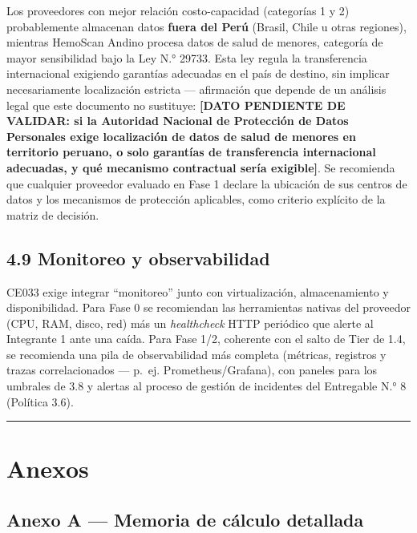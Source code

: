 \documentclass[11pt,a4paper]{article}
\begin{document}
Los proveedores con mejor relación costo-capacidad (categorías 1 y 2) probablemente almacenan datos \textbf{fuera del Perú} (Brasil, Chile u otras regiones), mientras HemoScan Andino procesa datos de salud de menores, categoría de mayor sensibilidad bajo la Ley N.° 29733. Esta ley regula la transferencia internacional exigiendo garantías adecuadas en el país de destino, sin implicar necesariamente localización estricta --- afirmación que depende de un análisis legal que este documento no sustituye: \textbf{{[}DATO PENDIENTE DE VALIDAR: si la Autoridad Nacional de Protección de Datos Personales exige localización de datos de salud de menores en territorio peruano, o solo garantías de transferencia internacional adecuadas, y qué mecanismo contractual sería exigible{]}}. Se recomienda que cualquier proveedor evaluado en Fase 1 declare la ubicación de sus centros de datos y los mecanismos de protección aplicables, como criterio explícito de la matriz de decisión.

\subsection{4.9 Monitoreo y observabilidad}\label{monitoreo-y-observabilidad}

CE033 exige integrar ``monitoreo'' junto con virtualización, almacenamiento y disponibilidad. Para Fase 0 se recomiendan las herramientas nativas del proveedor (CPU, RAM, disco, red) más un \emph{healthcheck} HTTP periódico que alerte al Integrante 1 ante una caída. Para Fase 1/2, coherente con el salto de Tier de 1.4, se recomienda una pila de observabilidad más completa (métricas, registros y trazas correlacionados --- p.~ej. Prometheus/Grafana), con paneles para los umbrales de 3.8 y alertas al proceso de gestión de incidentes del Entregable N.° 8 (Política 3.6).

\begin{center}\rule{0.5\linewidth}{0.5pt}\end{center}

\section{Anexos}\label{anexos}

\subsection{Anexo A --- Memoria de cálculo detallada}\label{anexo-a-memoria-de-cuxe1lculo-detallada}
\end{document}

